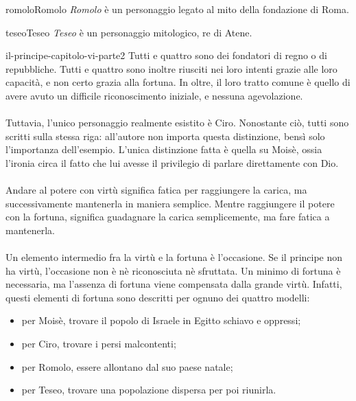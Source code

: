 \documentclass[preview]{standalone}
\begin{document}
\begin{snippetcharacter}{romolo}{Romolo}
    \textit{Romolo} è un personaggio legato al mito della fondazione di Roma.
\end{snippetcharacter}

\begin{snippetcharacter}{teseo}{Teseo}
    \textit{Teseo} è un personaggio mitologico, re di Atene.
\end{snippetcharacter}

\begin{snippet}{il-principe-capitolo-vi-parte2}
    Tutti e quattro sono dei fondatori di regno o di repubbliche.
    Tutti e quattro sono inoltre riusciti nei loro intenti grazie
    alle loro capacità, e non certo grazia alla fortuna.
    In oltre, il loro tratto comune è quello di avere avuto un difficile riconoscimento iniziale,
    e nessuna agevolazione.
    \\\\
    Tuttavia, l'unico personaggio realmente esistito è Ciro.
    Nonostante ciò, tutti sono scritti sulla stessa riga: all'autore non importa
    questa distinzione, bensì solo l'importanza dell'esempio.
    L'unica distinzione fatta è quella su Moisè, ossia l'ironia circa il fatto che lui
    avesse il privilegio di parlare direttamente con Dio. 
    \\\\
    Andare al potere con virtù significa fatica per raggiungere la carica,
    ma successivamente mantenerla in maniera semplice.
    Mentre raggiungere il potere con la fortuna, significa guadagnare la carica semplicemente,
    ma fare fatica a mantenerla.
    \\\\
    Un elemento intermedio fra la virtù e la fortuna è l'occasione.
    Se il principe non ha virtù, l'occasione non è nè riconosciuta nè sfruttata.
    Un minimo di fortuna è necessaria, ma l'assenza di fortuna viene compensata dalla grande virtù.
    Infatti, questi elementi di fortuna sono descritti per ognuno dei quattro modelli:
    \begin{itemize}
        \item per Moisè, trovare il popolo di Israele in Egitto schiavo e oppressi;
        \item per Ciro, trovare i persi malcontenti;
        \item per Romolo, essere allontano dal suo paese natale;
        \item per Teseo, trovare una popolazione dispersa per poi riunirla.
    \end{itemize}


\end{snippet}
\end{document}
